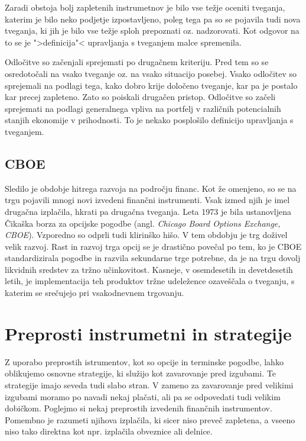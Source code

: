 \documentclass[12pt,a4paper]{amsart}
\theoremstyle{definition} %
\theoremstyle{plain} %
\begin{document}
Zaradi obstoja bolj zapletenih instrumetnov je bilo vse težje oceniti tveganja, katerim je bilo neko
podjetje izpostavljeno, poleg tega pa so se pojavila tudi nova tveganja, ki jih je bilo vse težje
sploh prepoznati oz. nadzorovati. Kot odgovor na to se je ">definicija"< upravljanja s tveganjem
malce spremenila.

Odločitve so začenjali sprejemati po drugačnem kriteriju. Pred tem so se osredotočali na vsako 
tveganje oz. na vsako situacijo posebej. Vsako odločitev so sprejemali na podlagi tega, kako dobro
krije določeno tveganje, kar pa je postalo kar precej zapleteno. Zato so poiskali drugačen pristop.
Odločitve so začeli sprejemati na podlagi generalnega vpliva na portfelj v različnih potencialnih
stanjih ekonomije v prihodnosti. To je nekako posplošilo definicijo upravljanja s tveganjem.

\subsection{CBOE}
Sledilo je obdobje hitrega razvoja na področju financ. Kot že omenjeno, so se na trgu pojavili mnogi novi izvedeni
finančni instrumenti. Vsak izmed njih je imel drugačna izplačila, hkrati pa drugačna tveganja. 
Leta 1973  je bila 
ustanovljena Čikaška borza za opcijske pogodbe (angl. \textit{Chicago Board Options
Exchange, CBOE}). Vzporedno so odprli tudi klirinško hišo. V tem obdobju je trg doživel velik
razvoj. Rast in razvoj trga opcij se je drastično povečal po tem, ko je CBOE standardizirala 
pogodbe in razvila sekundarne trge potrebne, da je na trgu dovolj likvidnih sredstev za 
tržno učinkovitost. Kasneje, v osemdesetih in devetdesetih letih, je implementacija teh 
produktov tržne udeležence ozaveščala o tveganju, s katerim se srečujejo pri 
vsakodnevnem trgovanju.

\section{Preprosti instrumetni in strategije}
Z uporabo preprostih istrumentov, kot so opcije in terminske pogodbe, lahko oblikujemo 
osnovne strategije, ki služijo kot zavarovanje pred izgubami. Te strategije imajo seveda 
tudi slabo stran. V zameno za zavarovanje pred velikimi izgubami moramo po navadi 
nekaj plačati, ali pa se odpovedati tudi velikim dobičkom. Poglejmo si nekaj preprostih 
izvedenih finančnih instrumentov. Pomembno je razumeti njihova izplačila, ki sicer niso 
preveč zapletena, a vseeno niso tako direktna kot npr. izplačila obveznice ali delnice. 
\end{document}
